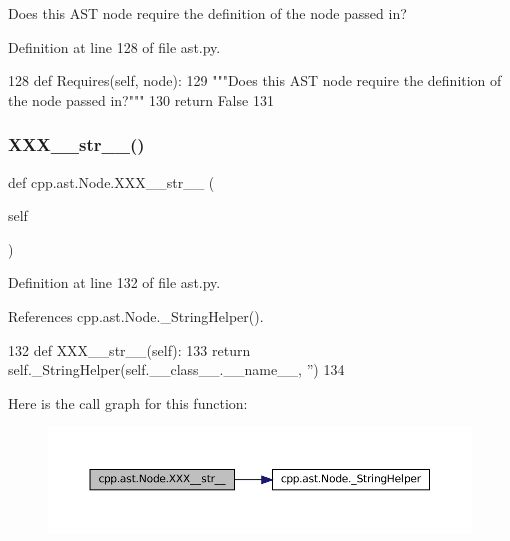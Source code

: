 \begin{DoxyVerb}Does this AST node require the definition of the node passed in?\end{DoxyVerb}
 

Definition at line 128 of file ast.\+py.


\begin{DoxyCode}
128     \textcolor{keyword}{def }Requires(self, node):
129         \textcolor{stringliteral}{"""Does this AST node require the definition of the node passed in?"""}
130         \textcolor{keywordflow}{return} \textcolor{keyword}{False}
131 
\end{DoxyCode}
\mbox{\label{classcpp_1_1ast_1_1Node_ab5dfeabcbcd7c1f5feb8522edffb8b4a}} 
\subsubsection{\texorpdfstring{X\+X\+X\+\_\+\+\_\+str\+\_\+\+\_\+()}{XXX\_\_str\_\_()}}
{\footnotesize\ttfamily def cpp.\+ast.\+Node.\+X\+X\+X\+\_\+\+\_\+str\+\_\+\+\_\+ (\begin{DoxyParamCaption}\item[{}]{self }\end{DoxyParamCaption})}



Definition at line 132 of file ast.\+py.



References cpp.\+ast.\+Node.\+\_\+\+String\+Helper().


\begin{DoxyCode}
132     \textcolor{keyword}{def }XXX\_\_str\_\_(self):
133         \textcolor{keywordflow}{return} self.\_StringHelper(self.\_\_class\_\_.\_\_name\_\_, \textcolor{stringliteral}{''})
134 
\end{DoxyCode}
Here is the call graph for this function\+:
\nopagebreak
\begin{figure}[H]
\begin{center}
\leavevmode
\includegraphics[width=350pt]{classcpp_1_1ast_1_1Node_ab5dfeabcbcd7c1f5feb8522edffb8b4a_cgraph}
\end{center}
\end{figure}



